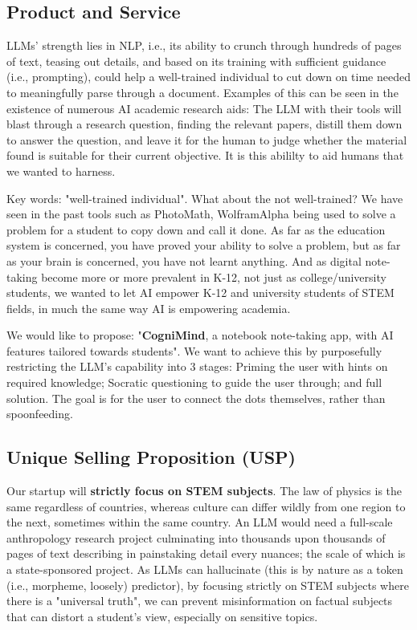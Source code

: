 \subsection{Product and Service}
LLMs' strength lies in NLP, i.e., its ability to crunch through hundreds of pages of text, teasing out details, and
based on its training with sufficient guidance (i.e., prompting), could help a well-trained individual to cut down on
time needed to meaningfully parse through a document. Examples of this can be seen in the existence of numerous AI
academic research aids: The LLM with their tools will blast through a research question, finding the relevant papers,
distill them down to answer the question, and leave it for the human to judge whether the material found is suitable
for their current objective. It is this abililty to aid humans that we wanted to harness.

Key words: "well-trained individual". What about the not well-trained? We have seen in the past tools such as PhotoMath,
WolframAlpha being used to solve a problem for a student to copy down and call it done. As far as the education system
is concerned, you have proved your ability to solve a problem, but as far as your brain is concerned, you have not
learnt anything. And as digital note-taking become more or more prevalent in K-12, not just as college/university
students, we wanted to let AI empower K-12 and university students of STEM fields, in much the same way AI is
empowering academia.

We would like to propose: "\textbf{CogniMind}, a notebook note-taking app, with AI features tailored towards students".
We want to achieve this by purposefully restricting the LLM's capability into 3 stages: Priming the user with hints on
required knowledge; Socratic questioning to guide the user through; and full solution. The goal is for the user to
connect the dots themselves, rather than spoonfeeding.

\subsection{Unique Selling Proposition (USP)}
Our startup will \textbf{strictly focus on STEM subjects}. The law of physics is the same regardless of countries,
whereas culture can differ wildly from one region to the next, sometimes within the same country. An LLM would need a
full-scale anthropology research project culminating into thousands upon thousands of pages of text describing in
painstaking detail every nuances; the scale of which is a state-sponsored project. As LLMs can hallucinate (this is by
nature as a token (i.e., morpheme, loosely) predictor), by focusing strictly on STEM subjects where there is a
"universal truth", we can prevent misinformation on factual subjects that can distort a student's view, especially on
sensitive topics.

